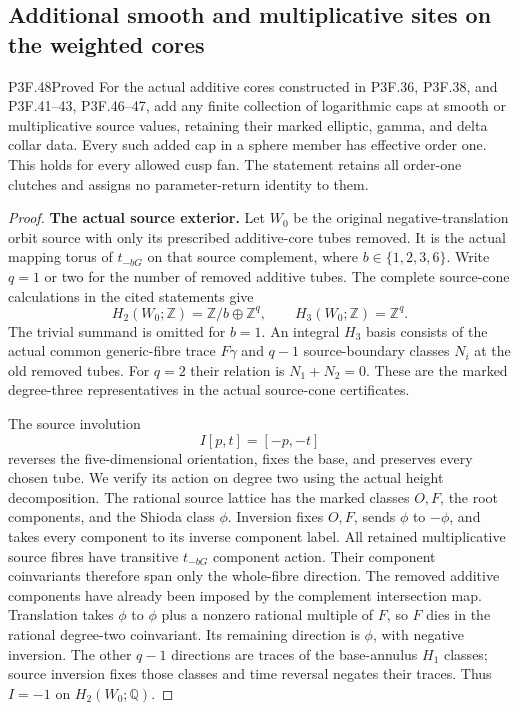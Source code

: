 \subsection{Additional smooth and multiplicative sites on the weighted cores}

\begin{statement}{P3F.48}{Proved}
For the actual additive cores constructed in
P3F.36, P3F.38, and P3F.41--43, P3F.46--47,
add any finite collection of logarithmic caps at smooth or
multiplicative source values, retaining their marked elliptic,
gamma, and delta collar data. Every such added cap in a sphere
member has effective order one. This holds for every allowed
cusp fan. The statement retains all order-one clutches and
assigns no parameter-return identity to them.
\end{statement}
\begin{proof}
\par\medskip\noindent\textbf{The actual source exterior.}
Let $W_0$ be the original negative-translation orbit source with
only its prescribed additive-core tubes removed. It is the
actual mapping torus of $t_{-bG}$ on that source complement,
where $b\in\{1,2,3,6\}$. Write $q=1$ or two for the number
of removed additive tubes. The complete source-cone calculations
in the cited statements give
\[
 H_2(W_0;\mathbb Z)=\mathbb Z/b\oplus\mathbb Z^q,
 \qquad H_3(W_0;\mathbb Z)=\mathbb Z^q.                         \tag{F48.1}
\]
The trivial summand is omitted for $b=1$.
An integral $H_3$ basis consists of the actual common generic-fibre
trace $F\gamma$ and $q-1$ source-boundary classes $N_i$ at
the old removed tubes. For $q=2$ their relation is
$N_1+N_2=0$. These are the marked degree-three representatives
in the actual source-cone certificates.

The source involution
\[
                         I[p,t]=[-p,-t]
\]
reverses the five-dimensional orientation, fixes the base, and
preserves every chosen tube. We verify its action on degree two
using the actual height decomposition. The rational source
lattice has the marked classes $O,F$, the root components, and
the Shioda class $\phi$. Inversion fixes $O,F$, sends
$\phi$ to $-\phi$, and takes every component to its inverse
component label. All retained multiplicative source fibres have
transitive $t_{-bG}$ component action. Their component
coinvariants therefore span only the whole-fibre direction.
The removed additive components have already been imposed by
the complement intersection map. Translation takes $\phi$ to
$\phi$ plus a nonzero rational multiple of $F$, so $F$ dies
in the rational degree-two coinvariant. Its remaining direction
is $\phi$, with negative inversion. The other $q-1$ directions
are traces of the base-annulus $H_1$ classes; source inversion
fixes those classes and time reversal negates their traces.
Thus $I=-1$ on $H_2(W_0;\mathbb Q)$.


\end{proof}
